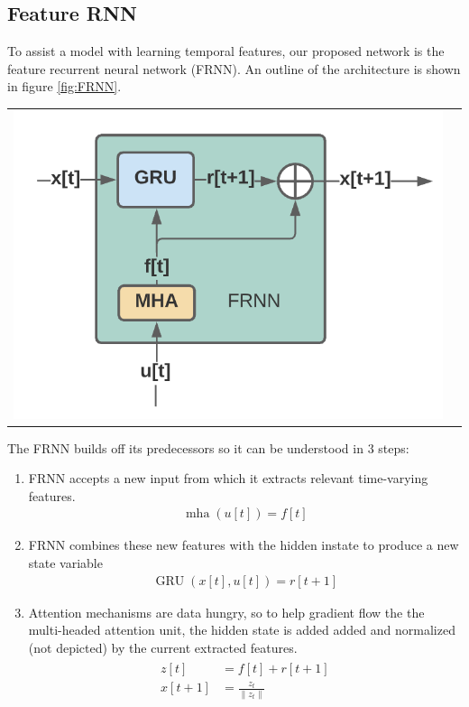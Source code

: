 \documentclass{article}
\DeclareMathOperator{\GRU}{\text{GRU}}
\DeclareMathOperator{\mha}{\text{mha}}
\numberwithin{equation}{subsection}
\begin{document}
\subsection{Feature RNN}

To assist a model with learning temporal features, our proposed network is the feature recurrent neural
network (FRNN). An outline of the architecture is shown in figure \ref{fig:FRNN}.

\begin{center}
  \begin{tabular}{cc}
    \includegraphics[width=.8\linewidth]{./figures/01-FRNN}
  \end{tabular}
   \label{fig:FRNN}
\end{center}
The FRNN builds off its predecessors so it can be understood in $3$ steps:
\begin{enumerate}
  \item FRNN accepts a new input from which it extracts relevant time-varying features.
  \begin{align}
    \mha(u[t]) = f[t]
  \end{align}
  \item FRNN combines these new features with the hidden instate to produce a new state variable
  \begin{align}
    \GRU(x[t], u[t]) = r[t+1]
  \end{align}
  \item Attention mechanisms are data hungry, so to help gradient flow the the multi-headed attention
        unit, the hidden state is added added and normalized (not depicted) by the current extracted
        features.
        \begin{align}
          \begin{split}
            z[t]   &= f[t] + r[t+1] \\
            x[t+1] &= \frac{z_t}{\| z_t \|}
          \end{split}
        \end{align}
\end{enumerate}
\end{document}
